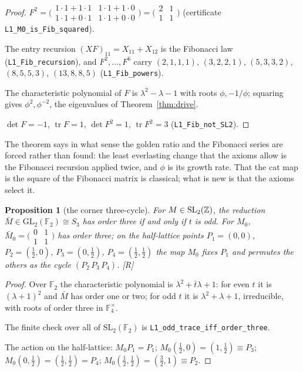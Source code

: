 \documentclass[11pt,a4paper]{article}
\theoremstyle{plain}
\newtheorem{proposition}[theorem]{Proposition}
\theoremstyle{definition}
\theoremstyle{remark}
\newcommand{\rigR}{[\textup{R}]}
\begin{document}
\begin{proof}
$F^{2}=\bigl(\begin{smallmatrix}1\cdot1+1\cdot1&1\cdot1+1\cdot0\\1\cdot1+0\cdot1&1\cdot1+0\cdot0\end{smallmatrix}\bigr)=\bigl(\begin{smallmatrix}2&1\\1&1\end{smallmatrix}\bigr)$ (certificate \texttt{L1\_M0\_is\_Fib\_squared}).

The entry recursion $(XF)_{11}=X_{11}+X_{12}$ is the Fibonacci law (\texttt{L1\_Fib\_recursion}), and $F^{2},\dots,F^{6}$ carry $(2,1,1,1)$, $(3,2,2,1)$, $(5,3,3,2)$, $(8,5,5,3)$, $(13,8,8,5)$ (\texttt{L1\_Fib\_powers}).

The characteristic polynomial of $F$ is $\lambda^{2}-\lambda-1$ with roots $\phi,-1/\phi$; squaring gives $\phi^{2},\phi^{-2}$, the eigenvalues of Theorem~\ref{thm:drive}.

$\det F=-1$, $\operatorname{tr}F=1$, $\det F^{2}=1$, $\operatorname{tr}F^{2}=3$ (\texttt{L1\_Fib\_not\_SL2}).
\end{proof}

The theorem says in what sense the golden ratio and the Fibonacci series are forced rather than found: the least everlasting change that the axioms allow is the Fibonacci recursion applied twice, and $\phi$ is its growth rate. That the cat map is the square of the Fibonacci matrix is classical; what is new is that the axioms select it.

\begin{proposition}[the corner three-cycle]\label{prop:threecycle}
For $M\in\mathrm{SL}_{2}(\mathbb{Z})$, the reduction $\bar M\in\mathrm{GL}_{2}(\mathbb{F}_{2})\cong S_{3}$ has order three if and only if $t$ is odd. For $M_{0}$, $\bar M_{0}=\bigl(\begin{smallmatrix}0&1\\1&1\end{smallmatrix}\bigr)$ has order three; on the half-lattice points $P_{1}=(0,0)$, $P_{2}=(\tfrac12,0)$, $P_{3}=(0,\tfrac12)$, $P_{4}=(\tfrac12,\tfrac12)$ the map $M_{0}$ fixes $P_{1}$ and permutes the others as the cycle $(P_{2}\,P_{3}\,P_{4})$. \rigR
\end{proposition}

\begin{proof}
Over $\mathbb{F}_{2}$ the characteristic polynomial is $\lambda^{2}+\bar t\lambda+1$: for even $t$ it is $(\lambda+1)^{2}$ and $\bar M$ has order one or two; for odd $t$ it is $\lambda^{2}+\lambda+1$, irreducible, with roots of order three in $\mathbb{F}_{4}^{\times}$.

The finite check over all of $\mathrm{SL}_{2}(\mathbb{F}_{2})$ is \texttt{L1\_odd\_trace\_iff\_order\_three}.

The action on the half-lattice: $M_{0}P_{1}=P_{1}$; $M_{0}(\tfrac12,0)=(1,\tfrac12)\equiv P_{3}$; $M_{0}(0,\tfrac12)=(\tfrac12,\tfrac12)=P_{4}$; $M_{0}(\tfrac12,\tfrac12)=(\tfrac32,1)\equiv P_{2}$.
\end{proof}
\end{document}
